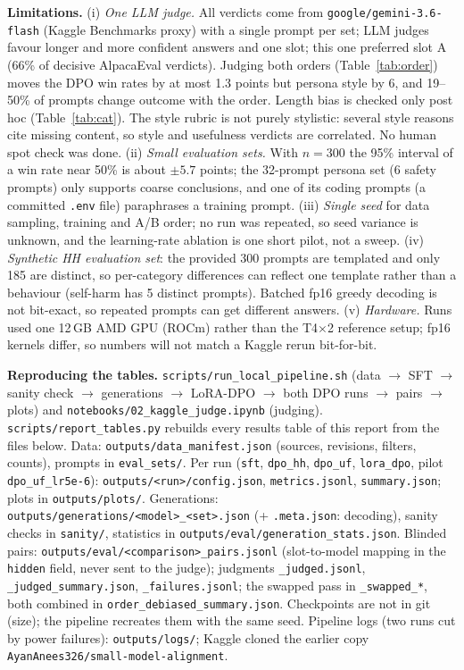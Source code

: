 \documentclass[10pt]{article}
\newcommand{\fp}[1]{\nolinkurl{#1}}
\begin{document}
\textbf{Limitations.}
(i) \emph{One LLM judge.} All verdicts come from \texttt{google/gemini-3.6-flash} (Kaggle Benchmarks proxy) with a single prompt per set; LLM judges favour longer and more confident answers and one slot; this one
preferred slot A (66\% of decisive AlpacaEval verdicts). Judging both orders (Table~\ref{tab:order}) moves the DPO win
rates by at most 1.3 points but persona style by 6, and 19--50\% of prompts change outcome with the order. Length bias is checked only post hoc (Table~\ref{tab:cat}). The style rubric
is not purely stylistic: several style reasons cite missing content, so style and usefulness verdicts are correlated.
No human spot check was done.
(ii) \emph{Small evaluation sets.} With $n=300$ the 95\% interval of a win rate near 50\% is about
$\pm5.7$ points; the 32-prompt persona set (6 safety prompts) only supports coarse conclusions, and one of its coding prompts (a committed \texttt{.env} file) paraphrases a training prompt.
(iii) \emph{Single seed} for data sampling, training and A/B order; no run was repeated, so seed variance is unknown,
and the learning-rate ablation is one short pilot, not a sweep.
(iv) \emph{Synthetic HH evaluation set}: the provided 300 prompts are templated and only 185 are distinct, so
per-category differences can reflect one template rather than a behaviour (self-harm has 5 distinct prompts). Batched fp16 greedy decoding is not bit-exact, so repeated prompts can get different answers.
(v) \emph{Hardware.} Runs used one 12\,GB AMD GPU (ROCm) rather than the T4$\times$2 reference setup; fp16 kernels
differ, so numbers will not match a Kaggle rerun bit-for-bit.

\textbf{Reproducing the tables.} \fp{scripts/run_local_pipeline.sh} (data $\to$ SFT $\to$ sanity check $\to$
generations $\to$ LoRA-DPO $\to$ both DPO runs $\to$ pairs $\to$ plots) and \fp{notebooks/02_kaggle_judge.ipynb}
(judging). \fp{scripts/report_tables.py} rebuilds every results table of this report from the files below.
Data: \fp{outputs/data_manifest.json} (sources, revisions, filters, counts), prompts in \fp{eval_sets/}.
Per run (\fp{sft}, \fp{dpo_hh}, \fp{dpo_uf}, \fp{lora_dpo}, pilot \fp{dpo_uf_lr5e-6}): \fp{outputs/<run>/config.json},
\fp{metrics.jsonl}, \fp{summary.json}; plots in \fp{outputs/plots/}. Generations:
\fp{outputs/generations/<model>_<set>.json} (+ \fp{.meta.json}: decoding), sanity checks in \fp{sanity/}, statistics in
\fp{outputs/eval/generation_stats.json}. Blinded pairs: \fp{outputs/eval/<comparison>_pairs.jsonl} (slot-to-model
mapping in the \fp{hidden} field, never sent to the judge); judgments \fp{_judged.jsonl}, \fp{_judged_summary.json},
\fp{_failures.jsonl}; the swapped pass in \fp{_swapped_*}, both combined in \fp{order_debiased_summary.json}.
Checkpoints are not in git (size); the pipeline recreates them with the same seed.
Pipeline logs (two runs cut by power failures): \fp{outputs/logs/}; Kaggle cloned the earlier copy
\texttt{AyanAnees326/small-model-alignment}.
\end{document}
